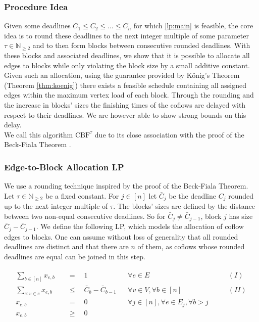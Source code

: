 \documentclass[11pt]{article}
\begin{document}
\subsubsection*{Procedure Idea}

Given some deadlines $C_1 \le C_2 \le \dotsc \le C_n$ for which \ref{lp:main} is feasible, the core idea is to round these deadlines to the next integer multiple of some parameter $\tau \in \mathbb{N}_{\ge 2}$ and to then form blocks between consecutive rounded deadlines. With these blocks and associated deadlines, we show that it is possible to allocate all edges to blocks while only violating the block size by a small additive constant. Given such an allocation, using the guarantee provided by Kőnig's Theorem (Theorem \ref{thm:koenig}) there exists a feasible schedule containing all assigned edges within the maximum vertex load of each block. Through the rounding and the increase in blocks' sizes the finishing times of the coflows are delayed with respect to their deadlines. We are however able to show strong bounds on this delay.\\
We call this algorithm $\mathrm{CBF}^\tau$ due to its close association with the proof of the Beck-Fiala Theorem \cite{Beck1981}.

\subsubsection*{Edge-to-Block Allocation LP}
We use a rounding technique inspired by the proof of the Beck-Fiala Theorem. Let $\tau \in \mathbb{N}_{\ge 2}$ be a fixed constant. For $j \in [n]$ let $\bar{C}_j$ be the deadline $C_j$ rounded up to the next integer multiple of $\tau$. The blocks' sizes are defined by the distance between two non-equal consecutive deadlines. So for $\bar{C}_j \neq \bar{C}_{j-1}$, block $j$ has size $\bar{C}_j - \bar{C}_{j-1}$. We define the following LP, which models the allocation of coflow edges to blocks. One can assume without loss of generality that all rounded deadlines are distinct and that there are $n$ of them, as coflows whose rounded deadlines are equal can be joined in this step.

\begin{gather*}\tag{LP CBF}\label{lp:cbf}
\begin{aligned}
\sum_{b \in [n]}x_{e,b} \quad &= \quad 1 &&\forall e \in E &\qquad(I)\\
\sum_{e: v \in e} x_{e,b} \quad&\le \quad \bar{C}_b - \bar{C}_{b-1} &&\forall v \in V,\forall b \in [n]&\qquad(II)\\
x_{e,b} \quad&= \quad 0\quad &&\forall j \in [n],\forall e \in E_j,\forall b > j\\
x_{e,b} \quad&\ge\quad 0
\end{aligned}
\end{gather*}
\end{document}
